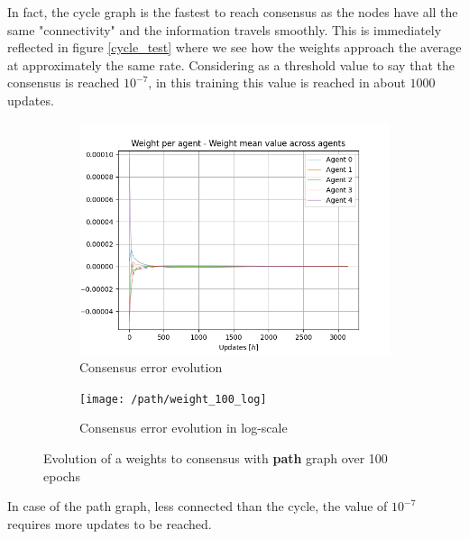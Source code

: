 \documentclass[a4paper,11pt,oneside]{book}
\begin{document}
In fact, the cycle graph is the fastest to reach consensus as the nodes have all the same "connectivity" and the information travels smoothly. This is immediately reflected in figure \ref{cycle_test} where we see how the weights approach the average at approximately the same rate. Considering as a threshold value to say that the consensus is reached $10^{-7}$, in this training this value is reached in about $1000$ updates.

\begin{figure}[h]
\centering
	\begin{subfigure}{0.49\textwidth}	
	\includegraphics[width=\textwidth]{path/weight_100}
	\caption{Consensus error evolution}
	\end{subfigure}
\hfill
	\begin{subfigure}{0.49\textwidth}	
	\texttt{[image: /path/weight\_100\_log]}
	\caption{Consensus error evolution in log-scale}
	\end{subfigure}
\caption{Evolution of a weights to consensus with \textbf{path} graph over 100 epochs}
\label{path_test}
\end{figure}

In case of the path graph, less connected than the cycle, the value of $10^{-7}$ requires more updates to be reached.
\end{document}

